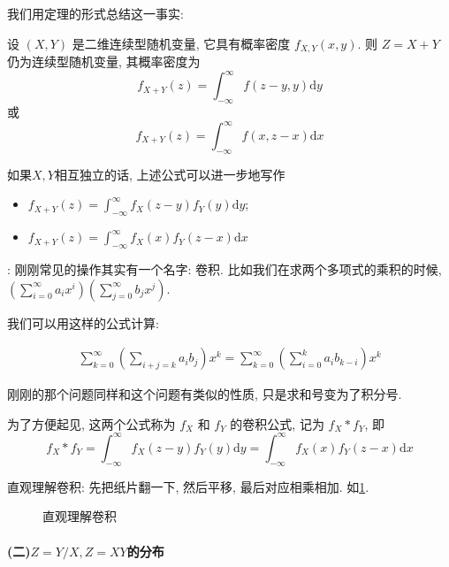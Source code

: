 我们用定理的形式总结这一事实: 
\begin{theorem}
    设 $(X, Y)$ 是二维连续型随机变量, 它具有概率密度 $f_{X,Y}(x, y)$. 则 $Z=X+Y$ 仍为连续型随机变量, 其概率密度为
    $$f_{X+Y}(z)=\int_{-\infty}^{\infty} f(z-y, y) \mathrm{d} y$$
    或
    $$
f_{X+Y}(z)=\int_{-\infty}^{\infty} f(x, z-x) \mathrm{d} x
$$
\end{theorem}

如果$X,Y$相互独立的话, 上述公式可以进一步地写作
\begin{itemize}
    \item $f_{X+Y}(z)=\int_{-\infty}^{\infty} f_X(z-y) f_Y(y) \mathrm{d} y$;
    \item $f_{X+Y}(z)=\int_{-\infty}^{\infty} f_X(x) f_Y(z-x) \mathrm{d} x$
\end{itemize}

\begin{asidebox}
    : 刚刚常见的操作其实有一个名字: 卷积. 比如我们在求两个多项式的乘积的时候, $(\sum_{i=0}^{\infty} a_i x^i)(\sum_{j=0}^{\infty} b_j x^j).$

    我们可以用这样的公式计算: 

    $$
    \begin{aligned}
        \sum_{k=0}^{\infty}\left(\sum_{i+j=k} a_i b_j\right) x^k
        =\sum_{k=0}^{\infty}\left(\sum_{i=0}^k a_i b_{k-i}\right) x^k
    \end{aligned}
    $$

    刚刚的那个问题同样和这个问题有类似的性质, 只是求和号变为了积分号. 

\end{asidebox}

为了方便起见, 这两个公式称为 $f_X$ 和 $f_Y$ 的卷积公式, 记为 $f_X * f_Y$, 即
$$
f_X * f_Y=\int_{-\infty}^{\infty} f_X(z-y) f_Y(y) \mathrm{d} y=\int_{-\infty}^{\infty} f_X(x) f_Y(z-x) \mathrm{d} x
$$

\begin{asidebox}
    直观理解卷积: 先把纸片翻一下, 然后平移, 最后对应相乘相加. 如\cref{fig:convolution}.
\end{asidebox}

\begin{figure}
    \center
    
    \caption{直观理解卷积}
    \label{fig:convolution}
\end{figure}

\paragraph{(二)$Z=Y/X,Z=XY$的分布}

